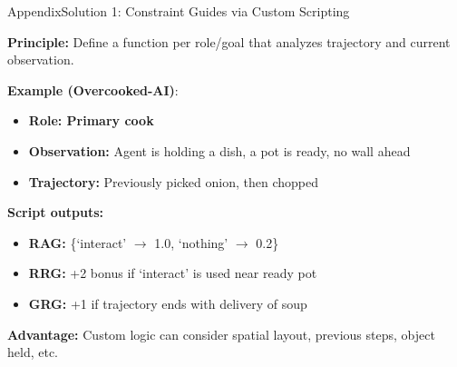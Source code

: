\begin{frame}{Appendix}{Solution 1: Constraint Guides via Custom Scripting}

    \textbf{Principle:} Define a function per role/goal that analyzes trajectory and current observation.

    \vspace{0.5em}
    \textbf{Example (Overcooked-AI)}:

    \begin{itemize}
        \item \textbf{Role: Primary cook}
        \item \textbf{Observation:} Agent is holding a dish, a pot is ready, no wall ahead
        \item \textbf{Trajectory:} Previously picked onion, then chopped
    \end{itemize}

    \textbf{Script outputs:}

    \begin{itemize}
        \item \textbf{RAG:} \{`interact' $\rightarrow$ 1.0, `nothing' $\rightarrow$ 0.2\}
        \item \textbf{RRG:} +2 bonus if `interact' is used near ready pot
        \item \textbf{GRG:} +1 if trajectory ends with delivery of soup
    \end{itemize}

    \textbf{Advantage:} Custom logic can consider spatial layout, previous steps, object held, etc.

\end{frame}


